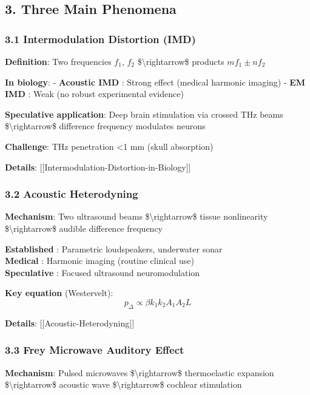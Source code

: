 \subsection{3. Three Main Phenomena}\label{three-main-phenomena}

\subsubsection{3.1 Intermodulation Distortion
(IMD)}\label{intermodulation-distortion-imd}

\textbf{Definition}: Two frequencies \(f_1\), \(f_2\)
\$\textbackslash rightarrow\$ products \(mf_1 \pm nf_2\)

\textbf{In biology}: - \textbf{Acoustic IMD} : Strong effect (medical
harmonic imaging) - \textbf{EM IMD} : Weak (no robust experimental
evidence)

\textbf{Speculative application}: Deep brain stimulation via crossed THz
beams \$\textbackslash rightarrow\$ difference frequency modulates
neurons

\textbf{Challenge}: THz penetration \textless1 mm (skull absorption)

\textbf{Details}: {[}{[}Intermodulation-Distortion-in-Biology{]}{]}

\subsubsection{3.2 Acoustic Heterodyning}\label{acoustic-heterodyning}

\textbf{Mechanism}: Two ultrasound beams \$\textbackslash rightarrow\$
tissue nonlinearity \$\textbackslash rightarrow\$ audible difference
frequency

\textbf{Established }: Parametric loudspeakers, underwater sonar\\
\textbf{Medical }: Harmonic imaging (routine clinical use)\\
\textbf{Speculative }: Focused ultrasound neuromodulation

\textbf{Key equation} (Westervelt):
\[p_\Delta \propto \beta k_1 k_2 A_1 A_2 L\]

\textbf{Details}: {[}{[}Acoustic-Heterodyning{]}{]}

\subsubsection{3.3 Frey Microwave Auditory
Effect}\label{frey-microwave-auditory-effect}

\textbf{Mechanism}: Pulsed microwaves \$\textbackslash rightarrow\$
thermoelastic expansion \$\textbackslash rightarrow\$ acoustic wave
\$\textbackslash rightarrow\$ cochlear stimulation

